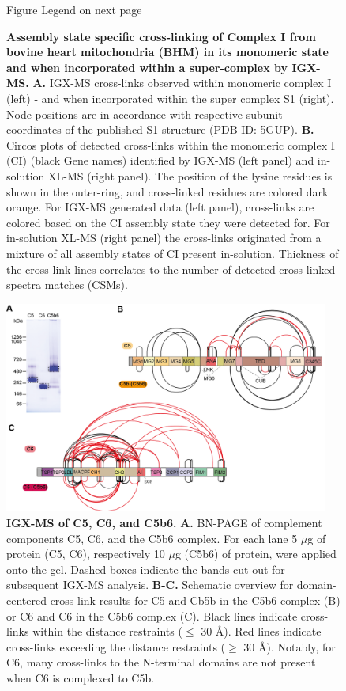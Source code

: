\begin{subappendices}
\begin{figure}[hb]
		\caption{Figure Legend on next page}
		\label{fig:ch2_app_fig5}
	\end{figure}
	\addtocounter{figure}{-1}
	\begin{figure}[ht]
		\caption{\textbf{Assembly state specific cross-linking of Complex I from bovine heart mitochondria (BHM) in its monomeric state and when incorporated within a super-complex by IGX-MS.} \textbf{A.} IGX-MS cross-links observed within monomeric complex I (left) - and when incorporated within the super complex S1 (right). Node positions are in accordance with respective subunit coordinates of the published S1 structure (PDB ID: 5GUP). \textbf{B.} Circos plots of detected cross-links within the monomeric complex I (CI) (black Gene names) identified by IGX-MS (left panel) and in-solution XL-MS (right panel). The position of the lysine residues is shown in the outer-ring, and cross-linked residues are colored dark orange. For IGX-MS generated data (left panel), cross-links are colored based on the CI assembly state they were detected for. For in-solution XL-MS (right panel) the cross-links originated from a mixture of all assembly states of CI present in-solution. Thickness of the cross-link lines correlates to the number of detected cross-linked spectra matches (CSMs).}
	\end{figure}
	\begin{figure}[hbt]
		\center
		\includegraphics[width=0.95\textwidth]{Chapter.2/Figures/SI_Figure5.png}
		\caption{\textbf{IGX-MS of C5, C6, and C5b6.} \textbf{A.} BN-PAGE of complement components C5, C6, and the C5b6 complex. For each lane 5 $\mu$g of protein (C5, C6), respectively 10 $\mu$g (C5b6) of protein, were applied onto the gel. Dashed boxes indicate the bands cut out for subsequent IGX-MS analysis. \textbf{B-C.} Schematic overview for domain-centered cross-link results for C5 and Cb5b in the C5b6 complex (B) or C6 and C6 in the C5b6 complex (C). Black lines indicate cross-links within the distance restraints ($\leq$ 30 Å). Red lines indicate cross-links exceeding the distance restraints ($\geq$ 30 Å). Notably, for C6, many cross-links to the N-terminal domains are not present when C6 is complexed to C5b.}

\end{figure}
\end{subappendices}

